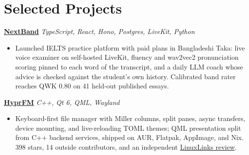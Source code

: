 \documentclass[10pt,a4paper]{article}
\newcommand{\project}[2]{\textbf{#1} \hfill \textit{#2}}
\begin{document}
\section*{Selected Projects}
\project{\href{https://nextband.app}{NextBand}}{TypeScript, React, Hono, Postgres, LiveKit, Python}
\begin{itemize}
  \item Launched IELTS practice platform with paid plans in Bangladeshi Taka: live voice examiner on self-hosted LiveKit, fluency and wav2vec2 pronunciation scoring pinned to each word of the transcript, and a daily LLM coach whose advice is checked against the student's own history. Calibrated band rater reaches QWK 0.80 on 41 held-out published essays.
\end{itemize}

\project{\href{https://github.com/soyeb-jim285/hyprfm}{HyprFM}}{C++, Qt 6, QML, Wayland}
\begin{itemize}
  \item Keyboard-first file manager with Miller columns, split panes, async transfers, device mounting, and live-reloading TOML themes; QML presentation split from C++ backend services, shipped on AUR, Flatpak, AppImage, and Nix. 398 stars, 14 outside contributors, and an independent \href{https://www.linuxlinks.com/hyprfm-qt6-qml-file-manager/}{LinuxLinks review}.
\end{itemize}
\end{document}
